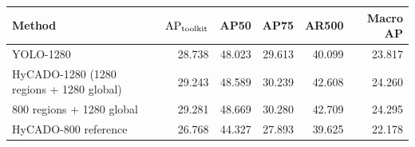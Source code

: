 \begin{tabular}{lrrrrr}
\toprule
Method & $\mathrm{AP}_{\mathrm{toolkit}}$ & AP50 & AP75 & AR500 & Macro AP\\
\midrule
YOLO-1280 & 28.738 & 48.023 & 29.613 & 40.099 & 23.817\\
HyCADO-1280 (1280 regions + 1280 global) & 29.243 & 48.589 & 30.239 & 42.608 & 24.260\\
800 regions + 1280 global & 29.281 & 48.669 & 30.280 & 42.709 & 24.295\\
HyCADO-800 reference & 26.768 & 44.327 & 27.893 & 39.625 & 22.178\\
\bottomrule
\end{tabular}
